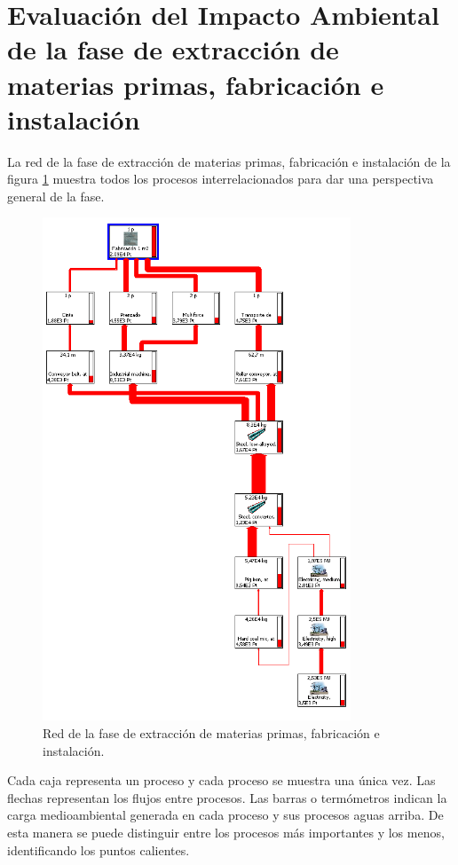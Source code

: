 \section{Evaluación del Impacto Ambiental de la fase de extracción de materias primas, fabricación e instalación}

La red de la fase de extracción de materias primas, fabricación e instalación de la figura \ref{fig:fabric_red} muestra todos los procesos interrelacionados para dar una perspectiva general de la fase.

\begin{figure}[!htb]
\centering
\includegraphics[height=15cm]{img/fabric_red.png}
\caption{Red de la fase de extracción de materias primas, fabricación e instalación.}
\label{fig:fabric_red}
\end{figure}

Cada caja representa un proceso y cada proceso se muestra una única vez. Las flechas representan los flujos entre procesos. Las barras o termómetros indican la carga medioambiental generada en cada proceso y sus procesos aguas arriba. De esta manera se puede distinguir entre los procesos más importantes y los menos, identificando los puntos calientes.

